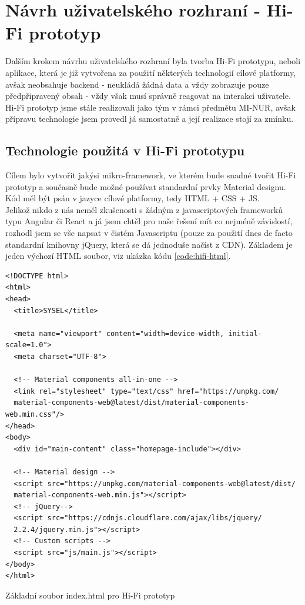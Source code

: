 \section{Návrh uživatelského rozhraní - Hi-Fi prototyp}

Dalším krokem návrhu uživatelského rozhraní byla tvorba Hi-Fi prototypu, neboli aplikace, která je již vytvořena za použití některých technologií cílové platformy, avšak neobsahuje backend - neukládá žádná data a vždy zobrazuje pouze předpřipravený obsah - vždy však musí správně reagovat na interakci uživatele.\\
Hi-Fi prototyp jsme stále realizovali jako tým v rámci předmětu MI-NUR, avšak přípravu technologie jsem provedl já samostatně a její realizace stojí za zmínku.


\subsection{Technologie použitá v Hi-Fi prototypu}

Cílem bylo vytvořit jakýsi mikro-framework, ve kterém bude snadné tvořit \mbox{Hi-Fi} prototyp a současně bude možné používat standardní prvky Material designu. Kód měl být psán v jazyce cílové platformy, tedy HTML + CSS + JS.\\
Jelikož nikdo z nás neměl zkušenosti s žádným z javascriptových frameworků typu Angular či React a já jsem chtěl pro naše řešení mít co nejméně závislostí, rozhodl jsem se vše napsat v čistém Javascriptu (pouze za použití dnes de facto standardní knihovny jQuery, která se dá jednoduše načíst z CDN). Základem je jeden výchozí HTML soubor, viz ukázka kódu \ref{code:hifi-html}.

\begin{listing}[H]
\begin{verbatim}
<!DOCTYPE html>
<html>
<head>
  <title>SYSEL</title>

  <meta name="viewport" content="width=device-width, initial-scale=1.0">
  <meta charset="UTF-8">

  <!-- Material components all-in-one -->
  <link rel="stylesheet" type="text/css" href="https://unpkg.com/
  material-components-web@latest/dist/material-components-web.min.css"/>
</head>
<body>
  <div id="main-content" class="homepage-include"></div>

  <!-- Material design -->
  <script src="https://unpkg.com/material-components-web@latest/dist/
  material-components-web.min.js"></script>
  <!-- jQuery-->
  <script src="https://cdnjs.cloudflare.com/ajax/libs/jquery/
  2.2.4/jquery.min.js"></script>
  <!-- Custom scripts -->
  <script src="js/main.js"></script>
</body>
</html>
\end{verbatim}
\caption{Základní soubor index.html pro Hi-Fi prototyp} \label{code:hifi-html}
\end{listing}

